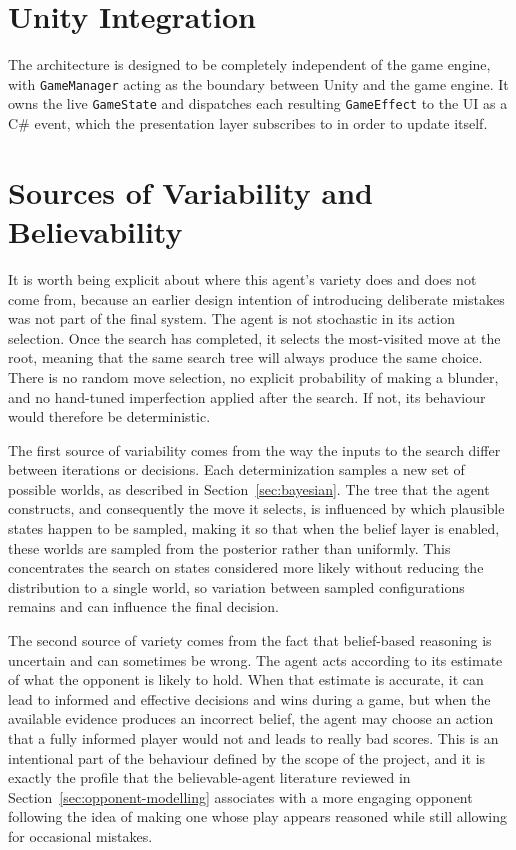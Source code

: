 \documentclass[12pt,a4paper,oneside]{report}
\begin{document}
\section{Unity Integration}
\label{sec:unity}

The architecture is designed to be completely independent of the game engine, with \texttt{GameManager} acting as the boundary between Unity and the game engine. It owns the live \texttt{GameState} and dispatches each resulting \texttt{GameEffect} to the UI as a C\# event, which the presentation layer subscribes to in order to update itself.

\section{Sources of Variability and Believability}
\label{sec:variability}

It is worth being explicit about where this agent's variety does and does not come from, because an earlier design intention of introducing deliberate mistakes was not part of the final system. The agent is not stochastic in its action selection. Once the search has completed, it selects the most-visited move at the root, meaning that the same search tree will always produce the same choice. There is no random move selection, no explicit probability of making a blunder, and no hand-tuned imperfection applied after the search. If not, its behaviour would therefore be deterministic.

The first source of variability comes from the way the inputs to the search differ between iterations or decisions.  Each determinization samples a new set of possible worlds, as described in Section~\ref{sec:bayesian}. The tree that the agent constructs, and consequently the move it selects, is influenced by which plausible states happen to be sampled, making it so that when the belief layer is enabled, these worlds are sampled from the posterior rather than uniformly. This concentrates the search on states considered more likely without reducing the distribution to a single world, so variation between sampled configurations remains and can influence the final decision.

The second source of variety comes from the fact that belief-based reasoning is uncertain and can sometimes be wrong. The agent acts according to its estimate of what the opponent is likely to hold. When that estimate is accurate, it can lead to informed and effective decisions and wins during a game, but when the available evidence produces an incorrect belief, the agent may choose an action that a fully informed player would not and leads to really bad scores. This is an intentional part of the behaviour defined by the scope of the project, and it is exactly the profile that the believable-agent literature reviewed in Section~\ref{sec:opponent-modelling} associates with a more engaging opponent following the idea of making one whose play appears reasoned while still allowing for occasional mistakes. 
\end{document}
